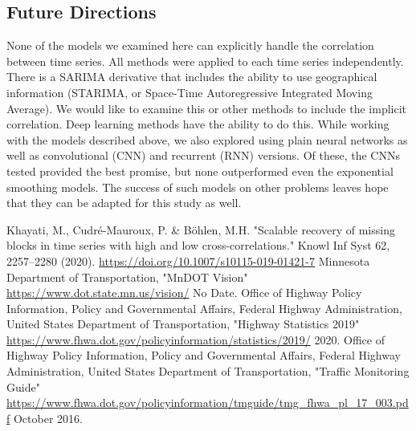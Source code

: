 \documentclass[9pt,twocolumn,twoside, lineno]{jost-new}
\numberwithin{subsection}{section}
\begin{document}
\subsection{Future Directions}
None of the models we examined here can explicitly handle the correlation between time series.
All methods were applied to each time series independently.
There is a SARIMA derivative that includes the ability to use geographical information (STARIMA, or Space-Time Autoregressive Integrated Moving Average).
We would like to examine this or other methods to include the implicit correlation.
Deep learning methods have the ability to do this.
While working with the models described above, we also explored using plain neural networks as well as convolutional (CNN) and recurrent (RNN) versions.
Of these, the CNNs tested provided the best promise, but none outperformed even the exponential smoothing models.
The success of such models on other problems leaves hope that they can be adapted for this study as well.


\begin{thebibliography}{9}
    Khayati, M., Cudré-Mauroux, P. \& Böhlen, M.H.
    "Scalable recovery of missing blocks in time series with high and low cross-correlations."
    Knowl Inf Syst 62, 2257–2280 (2020).
    \url{https://doi.org/10.1007/s10115-019-01421-7}
Minnesota Department of Transportation,
"MnDOT Vision"
\url{https://www.dot.state.mn.us/vision/}
No Date.
Office of Highway Policy Information, Policy and Governmental Affairs, Federal Highway Administration, United States
Department of Transportation,
"Highway Statistics 2019"
\url{https://www.fhwa.dot.gov/policyinformation/statistics/2019/}
2020.
Office of Highway Policy Information, Policy and Governmental Affairs, Federal Highway Administration, United States
Department of Transportation,
"Traffic Monitoring Guide"
\url{https://www.fhwa.dot.gov/policyinformation/tmguide/tmg_fhwa_pl_17_003.pdf}
October 2016.



\end{thebibliography}
\end{document}
